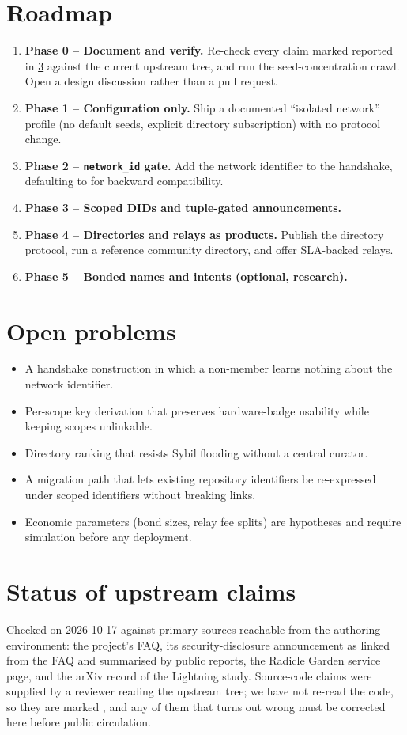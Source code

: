 \documentclass[a4paper,11pt,twoside,parskip=half-,headings=small]{scrartcl}
\begin{document}
\section{Roadmap}
\label{sec:roadmap}
\begin{enumerate}
  \item \textbf{Phase 0 -- Document and verify.} Re-check every claim marked reported in \cref{sec:verify} against the current upstream tree, and run the seed-concentration crawl. Open a design discussion rather than a pull request.
  \item \textbf{Phase 1 -- Configuration only.} Ship a documented ``isolated network'' profile (no default seeds, explicit directory subscription) with no protocol change.
  \item \textbf{Phase 2 -- \texttt{network\_id} gate.} Add the network identifier to the handshake, defaulting to  for backward compatibility.
  \item \textbf{Phase 3 -- Scoped DIDs and tuple-gated announcements.}
  \item \textbf{Phase 4 -- Directories and relays as products.} Publish the directory protocol, run a reference community directory, and offer SLA-backed relays.
  \item \textbf{Phase 5 -- Bonded names and intents (optional, research).}
\end{enumerate}

\section{Open problems}
\label{sec:open}
\begin{itemize}
  \item A handshake construction in which a non-member learns nothing about the network identifier.
  \item Per-scope key derivation that preserves hardware-badge usability while keeping scopes unlinkable.
  \item Directory ranking that resists Sybil flooding without a central curator.
  \item A migration path that lets existing repository identifiers be re-expressed under scoped identifiers without breaking links.
  \item Economic parameters (bond sizes, relay fee splits) are  hypotheses and require simulation before any deployment.
\end{itemize}

\section{Status of upstream claims}
\label{sec:verify}
Checked on 2026-10-17 against primary sources reachable from the authoring environment: the project's FAQ, its security-disclosure announcement as linked from the FAQ and summarised by public reports, the Radicle Garden service page, and the arXiv record of the Lightning study. Source-code claims were supplied by a reviewer reading the upstream tree; we have not re-read the code, so they are marked , and any of them that turns out wrong must be corrected here before public circulation.
\end{document}
